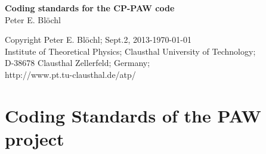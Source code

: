 \documentclass[11pt,a4paper]{report}
\begin{document}
\begin{titlepage}
\begin{center}
\vspace*{3.5cm}
{\huge \textbf{Coding standards for the CP-PAW code}}\\
\vspace{0.5cm}
{\large Peter E. Bl\"ochl}
\vspace{0.5cm} 
\end{center}

\vfill
\begin{center}
Copyright Peter E. Bl\"ochl; Sept.2, 2013-\today\\
{\small
Institute of Theoretical Physics;
Clausthal University of Technology;\\ 
D-38678 Clausthal Zellerfeld; Germany;\\
http://www.pt.tu-clausthal.de/atp/}
\end{center}
\end{titlepage}
\noindent            
\tableofcontents
\chapter{Coding Standards of the PAW project}
\end{document}
